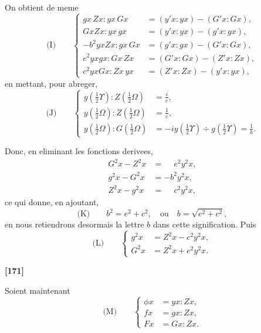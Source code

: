 \documentclass[11pt,a4paper]{article}
\begin{document}
On obtient de meme
\begin{equation*}
\text{(I)}\qquad
\left\{
\begin{aligned}
gx\, Zx : yx\, Gx &= (y'x : yx) - (G'x : Gx),\\
GxZx : yx\, gx &= (y'x : yx) - (g'x : gx),\\
-b^2yxZx : gx\, Gx &= (g'x : gx) - (G'x : Gx),\\
e^2yxgx : Gx\, Zx &= (G'x : Gx) - (Z'x : Zx),\\
c^2yxGx : Zx\, yx &= (Z'x : Zx) - (y'x : yx),
\end{aligned}
\right.
\end{equation*}
en mettant, pour abreger,
\begin{equation*}
\text{(J)}\qquad
\left\{
\begin{aligned}
y\left(\tfrac{1}{2}\Upsilon\right) : Z\left(\tfrac{1}{2}\Omega\right) &= \frac{i}{e},\\
y\left(\tfrac{1}{2}\Omega\right) : Z\left(\tfrac{1}{2}\Omega\right) &= \frac{1}{c},\\
y\left(\tfrac{1}{2}\Omega\right) : G\left(\tfrac{1}{2}\Omega\right) &= -iy\left(\tfrac{1}{2}\Upsilon\right) \div g\left(\tfrac{1}{2}\Upsilon\right) = \frac{1}{b}.
\end{aligned}
\right.
\end{equation*}

Donc, en eliminant les fonctions derivees,
\begin{align*}
G^2x - Z^2x &= \phantom{-}e^2 y^2x,\\
g^2x - G^2x &= -b^2 y^2x,\\
Z^2x - g^2x &= \phantom{-}c^2 y^2x,
\end{align*}
ce qui donne, en ajoutant,
\begin{equation*}
\text{(K)}\qquad b^2 = e^2 + c^2,\quad \text{ou}\quad b = \sqrt{e^2 + c^2},
\end{equation*}
en nous retiendrons desormais la lettre $b$ dans cette signification. Puis
\begin{equation*}
\text{(L)}\qquad
\left\{
\begin{aligned}
g^2x &= Z^2x - c^2 y^2x,\\
G^2x &= Z^2x + e^2 y^2x.
\end{aligned}
\right.
\end{equation*}


\textbf{[171]}

Soient maintenant
\begin{equation*}
\text{(M)}\qquad
\left\{
\begin{aligned}
\phi x &= yx : Zx,\\
fx &= gx : Zx,\\
Fx &= Gx : Zx.
\end{aligned}
\right.
\end{equation*}
\end{document}

